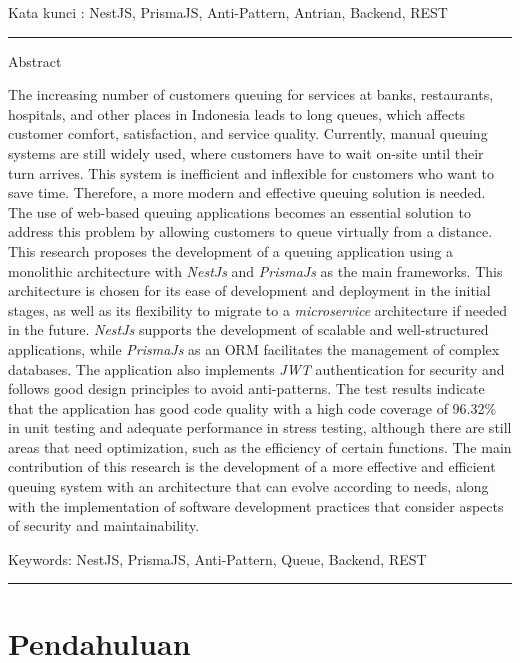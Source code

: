\bigskip
Kata kunci : NestJS, PrismaJS, Anti-Pattern, Antrian, Backend, REST






\noindent\rule{\textwidth}{1pt}
Abstract

The increasing number of customers queuing for services at banks, restaurants, hospitals, and other places in Indonesia leads to long queues, which affects customer comfort, satisfaction, and service quality. Currently, manual queuing systems are still widely used, where customers have to wait on-site until their turn arrives. This system is inefficient and inflexible for customers who want to save time. Therefore, a more modern and effective queuing solution is needed. The use of web-based queuing applications becomes an essential solution to address this problem by allowing customers to queue virtually from a distance. This research proposes the development of a queuing application using a monolithic architecture with \textit{NestJs} and \textit{PrismaJs} as the main frameworks. This architecture is chosen for its ease of development and deployment in the initial stages, as well as its flexibility to migrate to a \textit{microservice} architecture if needed in the future. \textit{NestJs} supports the development of scalable and well-structured applications, while \textit{PrismaJs} as an ORM facilitates the management of complex databases. The application also implements \textit{JWT} authentication for security and follows good design principles to avoid anti-patterns.
The test results indicate that the application has good code quality with a high code coverage of 96.32\% in unit testing and adequate performance in stress testing, although there are still areas that need optimization, such as the efficiency of certain functions. The main contribution of this research is the development of a more effective and efficient queuing system with an architecture that can evolve according to needs, along with the implementation of software development practices that consider aspects of security and maintainability.

\bigskip
Keywords: NestJS, PrismaJS, Anti-Pattern, Queue, Backend, REST

\noindent\rule{\textwidth}{1pt}



\section{Pendahuluan}

